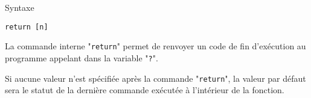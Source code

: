 \begin{definition}{Syntaxe}
\begin{verbatim}
return [n]
\end{verbatim}
\end{definition}

La commande interne "\texttt{return}" permet de renvoyer un code de fin d'ex{\'e}cution au programme
appelant dans la variable "\texttt{?}".

Si aucune valeur n'est sp{\'e}cifi{\'e}e apr{\`e}s la commande "\texttt{return}", la valeur par d{\'e}faut sera le
statut de la derni{\`e}re commande ex{\'e}cut{\'e}e {\`a} l'int{\'e}rieur de la fonction.

